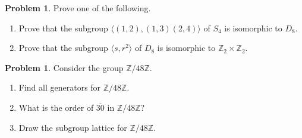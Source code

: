 \documentclass[11pt]{scrartcl}
\theoremstyle{definition}
\newtheorem{problem}[theorem]{Problem}
\begin{document}
\begin{problem}
Prove one of the following.
\begin{enumerate}[label=\rm{(\alph*)}]
\item Prove that the subgroup $\langle(1,2), (1,3)(2,4)\rangle$ of $S_4$ is isomorphic to $D_8$.
\item Prove that the subgroup $\langle s,r^2\rangle$ of $D_8$ is isomorphic to $\mathbb{Z}_2\times \mathbb{Z}_2$.
\end{enumerate}
\end{problem}

\begin{problem}
Consider the group $\mathbb{Z}/48\mathbb{Z}$.
\begin{enumerate}[label=\rm{(\alph*)}]
\item Find all generators for $\mathbb{Z}/48\mathbb{Z}$.
\item What is the order of $\overline{30}$ in $\mathbb{Z}/48\mathbb{Z}$?
\item Draw the subgroup lattice for $\mathbb{Z}/48\mathbb{Z}$.
\end{enumerate}
\end{problem}
\end{document}
